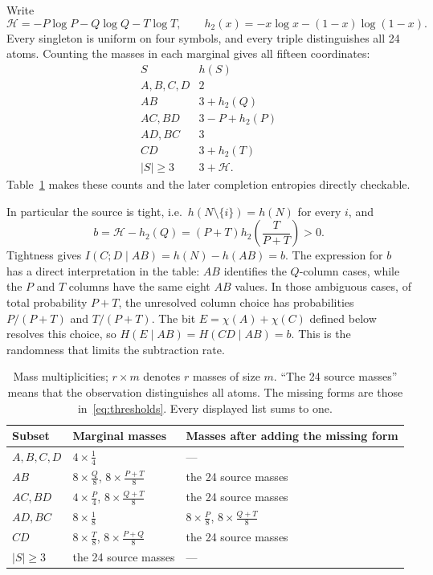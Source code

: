 \documentclass[a4paper,11pt]{article}
\newcommand{\hb}{h_2}
\begin{document}
Write
\[
 \mathcal H=-P\log P-Q\log Q-T\log T,\qquad
 \hb(x)=-x\log x-(1-x)\log(1-x).
\]
Every singleton is uniform on four symbols, and every triple distinguishes
all 24 atoms. Counting the masses in each marginal gives all fifteen coordinates:
\begin{equation}\label{eq:sourceentropy}
\begin{array}{c|c}
 S & h(S)\\\hline
 A,B,C,D&2\\
 AB&3+\hb(Q)\\
 AC,BD&3-P+\hb(P)\\
 AD,BC&3\\
 CD&3+\hb(T)\\
 |S|\ge3&3+\mathcal H.
\end{array}
\end{equation}
Table~\ref{tab:masses} makes these counts and the later completion
entropies directly checkable.

In particular the source is tight, i.e.\ $h(N\setminus\{i\})=h(N)$ for every $i$, and
\begin{equation}\label{eq:b}
 b=\mathcal H-\hb(Q)=(P+T)\hb\!\left(\frac{T}{P+T}\right)>0.
\end{equation}
Tightness gives $I(C;D\mid AB)=h(N)-h(AB)=b$.
The expression for $b$ has a direct interpretation in the table:
$AB$ identifies the $Q$-column cases, while the $P$ and $T$ columns
have the same eight $AB$ values. In those ambiguous cases, of total
probability $P+T$, the unresolved column choice has probabilities
$P/(P+T)$ and $T/(P+T)$. The bit $E=\chi(A)+\chi(C)$ defined below resolves this choice, so
$H(E\mid AB)=H(CD\mid AB)=b$. This is the randomness that limits the
subtraction rate.

\begin{table}[t]
\centering\small
\begin{tabular}{@{}lll@{}}
\toprule
Subset & Marginal masses & Masses after adding the missing form\\
\midrule
$A,B,C,D$ & $4\times\tfrac14$ & ---\\
$AB$ & $8\times\tfrac Q8$, $8\times\tfrac{P+T}8$ & the 24 source masses\\
$AC,BD$ & $4\times\tfrac P4$, $8\times\tfrac{Q+T}8$ & the 24 source masses\\
$AD,BC$ & $8\times\tfrac18$ & $8\times\tfrac P8$, $8\times\tfrac{Q+T}8$\\
$CD$ & $8\times\tfrac T8$, $8\times\tfrac{P+Q}8$ & the 24 source masses\\
$|S|\ge3$ & the 24 source masses & ---\\
\bottomrule
\end{tabular}
\caption{Mass multiplicities; $r\times m$ denotes $r$ masses of size $m$.
``The 24 source masses'' means that the observation distinguishes all atoms.
The missing forms are those in~\eqref{eq:thresholds}. Every displayed list sums to one.}
\label{tab:masses}
\end{table}
\end{document}

